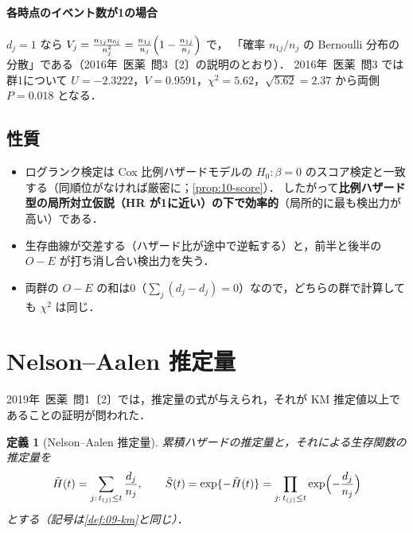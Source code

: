 \documentclass[a4paper,11pt,openany]{ltjsbook}
\newtheorem{teigi}{定義}[chapter]
\newcommand{\kakomon}[2]{\mbox{#1年 医薬 問#2}}
\begin{document}
\paragraph{各時点のイベント数が1の場合}
$d_j=1$ なら $V_j=\frac{n_{1j}n_{0j}}{n_j^2}=\frac{n_{1j}}{n_j}\Bigl(1-\frac{n_{1j}}{n_j}\Bigr)$ で，
「確率 $n_{1j}/n_j$ の Bernoulli 分布の分散」である（\kakomon{2016}{3}〔2〕の説明のとおり）．
\kakomon{2016}{3} では群1について $U=-2.3222$，$V=0.9591$，$\chi^2=5.62$，$\sqrt{5.62}=2.37$ から両側 $P=0.018$ となる．

\subsection{性質}
\begin{itemize}
\item ログランク検定は Cox 比例ハザードモデルの $H_0:\beta=0$ のスコア検定と一致する（同順位がなければ厳密に；\cref{prop:10-score}）．
      したがって\textbf{比例ハザード型の局所対立仮説（HR が1に近い）の下で効率的}（局所的に最も検出力が高い）である．
\item 生存曲線が交差する（ハザード比が途中で逆転する）と，前半と後半の $O-E$ が打ち消し合い検出力を失う．
\item 両群の $O-E$ の和は0（$\sum_j(d_j-d_j)=0$）なので，どちらの群で計算しても $\chi^2$ は同じ．
\end{itemize}

\section{Nelson--Aalen 推定量}\label{sec:09-na}
\kakomon{2019}{1}〔2〕では，推定量の式が与えられ，それが KM 推定値以上であることの証明が問われた．
\begin{teigi}[Nelson--Aalen 推定量]\label{def:09-na}
累積ハザードの推定量と，それによる生存関数の推定量を
\begin{equation}
\tilde H(t)=\sum_{j:\,t_{(j)}\le t}\frac{d_j}{n_j},\qquad \tilde S(t)=\exp\{-\tilde H(t)\}=\prod_{j:\,t_{(j)}\le t}\exp\Bigl(-\frac{d_j}{n_j}\Bigr)\label{eq:09-na}
\end{equation}
とする（記号は\cref{def:09-km}と同じ）．
\end{teigi}
\end{document}
